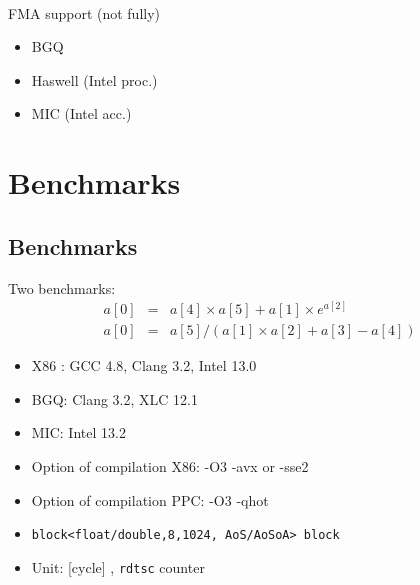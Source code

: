 \documentclass{beamer}
\begin{document}
\begin{frame}[fragile]
\begin{minipage}{0.4\textwidth}
 \\
FMA support (not fully)
\begin{itemize} 
\item BGQ 
\item Haswell (Intel proc.)
\item MIC (Intel acc.)
\end{itemize}
\end{minipage}

\end{frame}

\section[Benchmark]{Benchmarks}
\subsection*{Benchmarks}
\begin{frame}[fragile]
\centering
Two benchmarks:
\begin{eqnarray}
a[0] &=& a[4] \times a[5] + a[1] \times e^{a[2]} \\
a[0] &=& a[5]/(a[1] \times a[2]+a[3]-a[4])
\end{eqnarray}


\begin{itemize}
\item X86 : GCC 4.8, Clang 3.2, Intel 13.0 
\item BGQ: Clang 3.2, XLC 12.1
\item MIC: Intel 13.2
\item Option of compilation X86: -O3 -avx or -sse2 
\item Option of compilation PPC:  -O3 -qhot
\item \verb+block<float/double,8,1024, AoS/AoSoA> block+
\item Unit: [cycle] , \verb+rdtsc+ counter
\end{itemize}

\end{frame}
\end{document}
